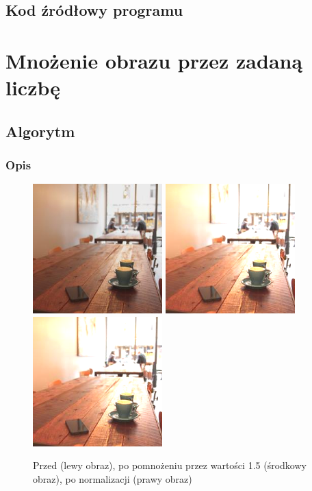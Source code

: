 \documentclass[a4paper,12pt]{book}
\begin{document}
\subsection*{Kod źródłowy programu}

\section{Mnożenie obrazu przez zadaną liczbę}
\subsection*{Algorytm}
\subsubsection*{Opis}
\begin{figure}[H]
	\caption{Przed (lewy obraz), po pomnożeniu przez wartości 1.5 (środkowy obraz), po normalizacji (prawy obraz)}
	\includegraphics[width=5cm, height=5cm]{coffee-unmodified.jpg}
	\includegraphics[width=5cm, height=5cm]{3-2/multiply-color-const-coffee-15.png}
	\includegraphics[width=5cm, height=5cm]{3-2/multiply-color-const-coffee-15-norm.png}
\end{figure}
\end{document}
